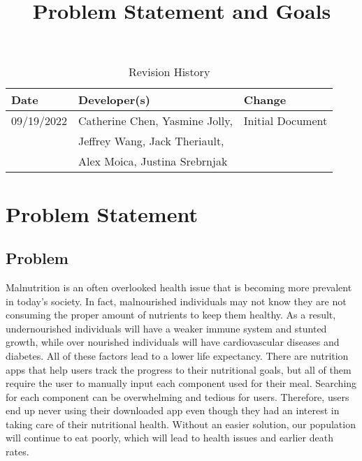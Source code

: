 \documentclass{article}
\title{Problem Statement and Goals\\\progname}
\author{\authname}
\date{}
\begin{document}
\maketitle

\begin{table}[hp]
\caption{Revision History} \label{TblRevisionHistory}
\begin{tabularx}{\textwidth}{llX}
\toprule
\textbf{Date} & \textbf{Developer(s)} & \textbf{Change}\\
\midrule
09/19/2022 & Catherine Chen, Yasmine Jolly, &Initial Document\\ 
&Jeffrey Wang, Jack Theriault, &\\
&Alex Moica, Justina Srebrnjak &\\
\bottomrule
\end{tabularx}
\end{table}

\newpage

\section{Problem Statement}


\subsection{Problem}

Malnutrition is an often overlooked health issue that is becoming more prevalent in today's society. In fact, malnourished individuals may not know they are not consuming the proper amount of nutrients to keep them healthy. As a result, undernourished individuals will have a weaker immune system and stunted growth, while over nourished individuals will have cardiovascular diseases and diabetes. All of these factors lead to a lower life expectancy. There are nutrition apps that help users track the progress to their nutritional goals, but all of them require the user to manually input each component used for their meal. Searching for each component can be overwhelming and tedious for users. Therefore, users end up never using their downloaded app even though they had an interest in taking care of their nutritional health. Without an easier solution, our population will continue to eat poorly, which will lead to health issues and earlier death rates.
\end{document}
